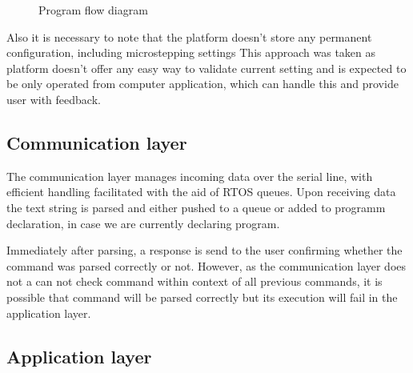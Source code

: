 \begin{figure}[h!]

  \caption[Program flow diagram]{Program flow diagram}
  \label{fig:code_diag}
\end{figure}

Also it is necessary to note that the platform doesn't store any permanent configuration, including microstepping settings
This approach was taken as platform doesn't offer any easy way to validate current setting and is expected to be only operated from computer application, which can handle this and provide user with feedback.

\subsection{Communication layer}

The communication layer manages incoming data over the serial line, with efficient handling facilitated with the aid of RTOS queues.
Upon receiving data the text string is parsed and either pushed to a queue or added to programm declaration, in case we are currently declaring program.

Immediately after parsing, a response is send to the user confirming whether the command was parsed correctly or not.
However, as the communication layer does not a can not check command within context of all previous commands, it is possible that command will be parsed correctly but its execution will fail in the application layer.



\subsection{Application layer}

